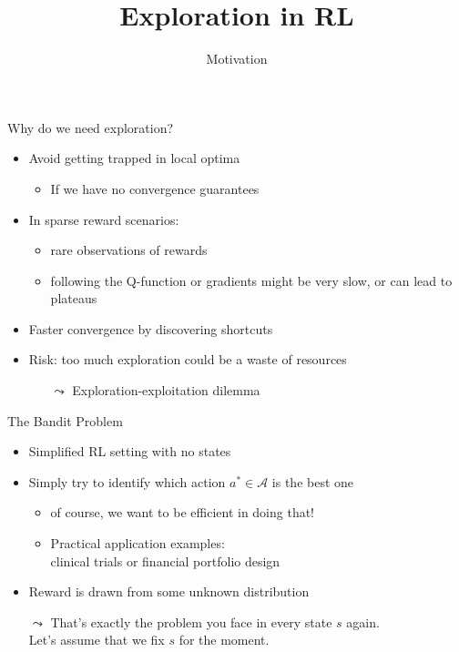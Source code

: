 \documentclass[aspectratio=169]{../latex_main/tntbeamer}  %
\title[RL: Exploration]{Exploration in RL}
\subtitle{Motivation}
\begin{document}
	
	\maketitle

\begin{frame}[c]{Why do we need exploration?}

\begin{itemize}
	\item Avoid getting trapped in local optima 
	\begin{itemize}
		\item If we have no convergence guarantees
	\end{itemize}
	\item In sparse reward scenarios:
	\begin{itemize}
		\item rare observations of rewards
		\item following the Q-function or gradients might be very slow, or can lead to plateaus 
	\end{itemize}
	\item Faster convergence by discovering shortcuts
	\bigskip
	\pause
	\item \alert{Risk:} too much exploration could be a waste of resources
	\begin{itemize}
		\item[$\leadsto$] Exploration-exploitation dilemma
	\end{itemize}
\end{itemize}

\end{frame}
\begin{frame}[c]{The Bandit Problem}

\begin{itemize}
	\item Simplified RL setting with \alert{no states}
	\item Simply try to identify which action $a^* \in \mathcal{A}$ is the best one
	\begin{itemize}
		\item of course, we want to be efficient in doing that!
		\item Practical application examples:\\ clinical trials or financial portfolio design
	\end{itemize}
	\item Reward is drawn from some unknown distribution
	\bigskip
	\pause
	\item[$\leadsto$] That's exactly the problem you face in every state $s$ again.\\ Let's assume that we fix $s$ for the moment.
\end{itemize}

\end{frame}
\end{document}
